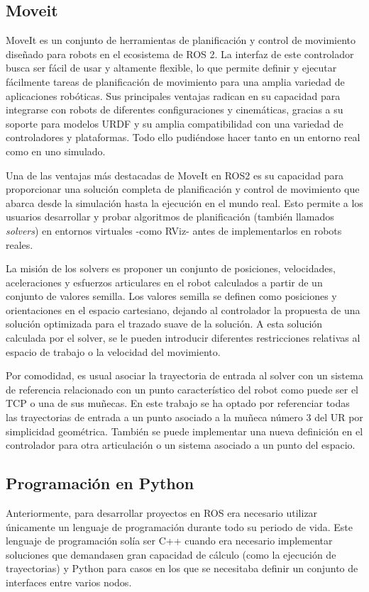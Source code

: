\subsection{Moveit}
MoveIt \cite{moveit_documentacion} es un conjunto de herramientas de planificación y control de movimiento diseñado para robots en el ecosistema de ROS 2. La interfaz de este controlador busca ser fácil de usar y altamente flexible, lo que permite definir y ejecutar fácilmente tareas de planificación de movimiento para una amplia variedad de aplicaciones robóticas. Sus principales ventajas radican en su capacidad para integrarse con robots de diferentes configuraciones y cinemáticas, gracias a su soporte para modelos \acrshort{URDF} y su amplia compatibilidad con una variedad de controladores y plataformas. Todo ello pudiéndose hacer tanto en un entorno real como en uno simulado.

Una de las ventajas más destacadas de MoveIt en ROS2 es su capacidad para proporcionar una solución completa de planificación y control de movimiento que abarca desde la simulación hasta la ejecución en el mundo real. Esto permite a los usuarios desarrollar y probar algoritmos de planificación (también llamados \textit{solvers}) en entornos virtuales -como RViz- antes de implementarlos en robots reales. 

La misión de los solvers es proponer un conjunto de posiciones, velocidades, aceleraciones y esfuerzos articulares en el robot calculados a partir de un conjunto de valores semilla. Los valores semilla se definen como posiciones y orientaciones en el espacio cartesiano, dejando al controlador la propuesta de una solución optimizada para el trazado suave de la solución. A esta solución calculada por el solver, se le pueden introducir diferentes restricciones relativas al espacio de trabajo o la velocidad del movimiento.

Por comodidad, es usual asociar la trayectoria de entrada al solver con un sistema de referencia relacionado con un punto característico del robot como puede ser el \acrshort{TCP} o una de sus muñecas. En este trabajo se ha optado por referenciar todas las trayectorias de entrada a un punto asociado a la muñeca número 3 del UR por simplicidad geométrica. También se puede implementar una nueva definición en el controlador para otra articulación o un sistema asociado a un punto del espacio.

\subsection{Programación en Python}
Anteriormente, para desarrollar proyectos en \acrshort{ROS} era necesario utilizar únicamente un lenguaje de programación durante todo su periodo de vida. Este lenguaje de programación solía ser C++ cuando era necesario implementar soluciones que demandasen gran capacidad de cálculo (como la ejecución de trayectorias) y Python para casos en los que se necesitaba definir un conjunto de interfaces entre varios  nodos.

